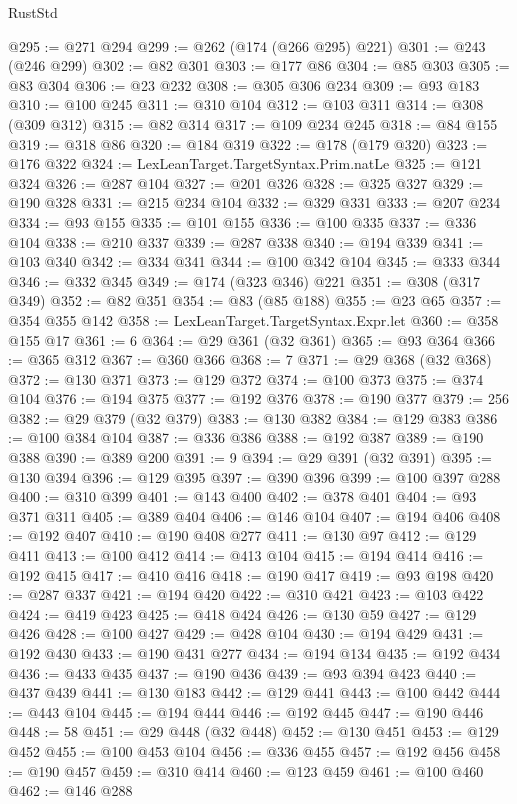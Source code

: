 \begin{lexlean}{RustStd}
\begin{coremodule}
{\begin{coremodule}
{{{{{{{{{{{{{{{{{{{{{{{{{{{{{{{{{{{{{{{{{{{{{{{{{{{{{{{@295 := @271 @294
@299 := @262 (@174 (@266 @295) @221)
@301 := @243 (@246 @299)
@302 := @82 @301
@303 := @177 @86
@304 := @85 @303
@305 := @83 @304
@306 := @23 @232
@308 := @305 @306 @234
@309 := @93 @183
@310 := @100 @245
@311 := @310 @104
@312 := @103 @311
@314 := @308 (@309 @312)
@315 := @82 @314
@317 := @109 @234 @245
@318 := @84 @155
@319 := @318 @86
@320 := @184 @319
@322 := @178 (@179 @320)
@323 := @176 @322
@324 := LexLeanTarget.TargetSyntax.Prim.natLe
@325 := @121 @324
@326 := @287 @104
@327 := @201 @326
@328 := @325 @327
@329 := @190 @328
@331 := @215 @234 @104
@332 := @329 @331
@333 := @207 @234
@334 := @93 @155
@335 := @101 @155
@336 := @100 @335
@337 := @336 @104
@338 := @210 @337
@339 := @287 @338
@340 := @194 @339
@341 := @103 @340
@342 := @334 @341
@344 := @100 @342 @104
@345 := @333 @344
@346 := @332 @345
@349 := @174 (@323 @346) @221
@351 := @308 (@317 @349)
@352 := @82 @351
@354 := @83 (@85 @188)
@355 := @23 @65
@357 := @354 @355 @142
@358 := LexLeanTarget.TargetSyntax.Expr.let
@360 := @358 @155 @17
@361 := 6
@364 := @29 @361 (@32 @361)
@365 := @93 @364
@366 := @365 @312
@367 := @360 @366
@368 := 7
@371 := @29 @368 (@32 @368)
@372 := @130 @371
@373 := @129 @372
@374 := @100 @373
@375 := @374 @104
@376 := @194 @375
@377 := @192 @376
@378 := @190 @377
@379 := 256
@382 := @29 @379 (@32 @379)
@383 := @130 @382
@384 := @129 @383
@386 := @100 @384 @104
@387 := @336 @386
@388 := @192 @387
@389 := @190 @388
@390 := @389 @200
@391 := 9
@394 := @29 @391 (@32 @391)
@395 := @130 @394
@396 := @129 @395
@397 := @390 @396
@399 := @100 @397 @288
@400 := @310 @399
@401 := @143 @400
@402 := @378 @401
@404 := @93 @371 @311
@405 := @389 @404
@406 := @146 @104
@407 := @194 @406
@408 := @192 @407
@410 := @190 @408 @277
@411 := @130 @97
@412 := @129 @411
@413 := @100 @412
@414 := @413 @104
@415 := @194 @414
@416 := @192 @415
@417 := @410 @416
@418 := @190 @417
@419 := @93 @198
@420 := @287 @337
@421 := @194 @420
@422 := @310 @421
@423 := @103 @422
@424 := @419 @423
@425 := @418 @424
@426 := @130 @59
@427 := @129 @426
@428 := @100 @427
@429 := @428 @104
@430 := @194 @429
@431 := @192 @430
@433 := @190 @431 @277
@434 := @194 @134
@435 := @192 @434
@436 := @433 @435
@437 := @190 @436
@439 := @93 @394 @423
@440 := @437 @439
@441 := @130 @183
@442 := @129 @441
@443 := @100 @442
@444 := @443 @104
@445 := @194 @444
@446 := @192 @445
@447 := @190 @446
@448 := 58
@451 := @29 @448 (@32 @448)
@452 := @130 @451
@453 := @129 @452
@455 := @100 @453 @104
@456 := @336 @455
@457 := @192 @456
@458 := @190 @457
@459 := @310 @414
@460 := @123 @459
@461 := @100 @460
@462 := @146 @288
}}}}}}}}}}}}}}}}}}}}}}}}}}}}}}}}}}}}}}}}}}}}}}}}}}}}}}}
\end{coremodule}}
\end{coremodule}
\end{lexlean}
